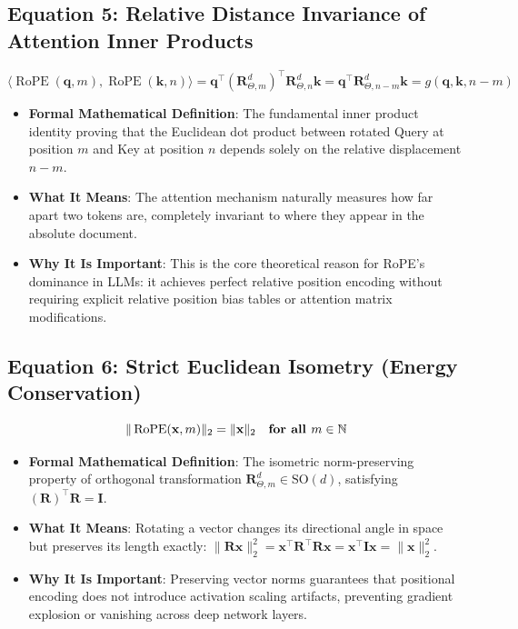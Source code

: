 \documentclass[11pt,a4paper]{article}
\theoremstyle{definition}
\begin{document}
\subsection{\textbf{Equation 5: Relative Distance Invariance of Attention Inner Products}}
{\boldmath
\begin{equation}
\langle \operatorname{RoPE}(\mathbf{q}, m), \operatorname{RoPE}(\mathbf{k}, n) \rangle = \mathbf{q}^\top (\mathbf{R}_{\Theta, m}^d)^\top \mathbf{R}_{\Theta, n}^d \mathbf{k} = \mathbf{q}^\top \mathbf{R}_{\Theta, n-m}^d \mathbf{k} = g(\mathbf{q}, \mathbf{k}, n - m)
\end{equation}
}
\begin{itemize}
    \item \textbf{Formal Mathematical Definition}:
    The fundamental inner product identity proving that the Euclidean dot product between rotated Query at position $m$ and Key at position $n$ depends solely on the relative displacement $n - m$.
    \item \textbf{What It Means}:
    The attention mechanism naturally measures how far apart two tokens are, completely invariant to where they appear in the absolute document.
    \item \textbf{Why It Is Important}:
    This is the core theoretical reason for RoPE's dominance in LLMs: it achieves perfect relative position encoding without requiring explicit relative position bias tables or attention matrix modifications.
\end{itemize}

\subsection{\textbf{Equation 6: Strict Euclidean Isometry (Energy Conservation)}}
{\boldmath
\begin{equation}
\|\operatorname{RoPE}(\mathbf{x}, m)\|_2 = \|\mathbf{x}\|_2 \quad \text{\textbf{for all }} m \in \mathbb{N}
\end{equation}
}
\begin{itemize}
    \item \textbf{Formal Mathematical Definition}:
    The isometric norm-preserving property of orthogonal transformation $\mathbf{R}_{\Theta, m}^d \in \mathrm{SO}(d)$, satisfying $(\mathbf{R})^\top \mathbf{R} = \mathbf{I}$.
    \item \textbf{What It Means}:
    Rotating a vector changes its directional angle in space but preserves its length exactly: $\|\mathbf{R}\mathbf{x}\|_2^2 = \mathbf{x}^\top \mathbf{R}^\top \mathbf{R} \mathbf{x} = \mathbf{x}^\top \mathbf{I} \mathbf{x} = \|\mathbf{x}\|_2^2$.
    \item \textbf{Why It Is Important}:
    Preserving vector norms guarantees that positional encoding does not introduce activation scaling artifacts, preventing gradient explosion or vanishing across deep network layers.
\end{itemize}
\end{document}
